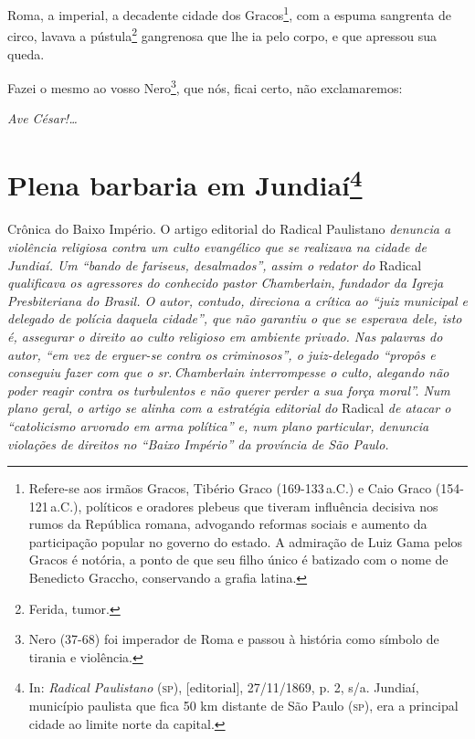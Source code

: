 \noindent\dotfill

Roma, a imperial, a decadente cidade dos Gracos\footnote{Refere-se aos
  irmãos Gracos, Tibério Graco (169-133\,a.C.) e Caio Graco (154-121\,a.C.), 
  políticos e oradores plebeus que tiveram influência
  decisiva nos rumos da República romana, advogando reformas sociais e
  aumento da participação popular no governo do estado. A admiração de
  Luiz Gama pelos Gracos é notória, a ponto de que seu filho único é
  batizado com o nome de Benedicto Graccho, conservando a grafia latina.\label{graco}},
com a espuma sangrenta de circo, lavava a pústula\footnote{Ferida,
  tumor.} gangrenosa que lhe ia pelo corpo, e que apressou sua queda.

Fazei o mesmo ao vosso Nero\footnote{Nero (37-68) foi imperador de
  Roma e passou à história como símbolo de tirania e violência.}, que
nós, ficai certo, não exclamaremos:

\emph{Ave César!\ldots{}}

\chapter{Plena barbaria em Jundiaí\footnote{In: \emph{Radical Paulistano}
  (\textsc{sp}), {[}editorial{]}, 27/11/1869, p. 2, s/a. Jundiaí, município
  paulista que fica 50 km distante de São Paulo (\textsc{sp}), era a principal
  cidade ao limite norte da capital.}}

\begin{didascalia}
Crônica do Baixo Império. O artigo editorial do Radical Paulistano
\emph{denuncia a violência religiosa contra um culto evangélico que se
realizava na cidade de Jundiaí. Um ``bando de fariseus, desalmados'',
assim o redator do} Radical \emph{qualificava os agressores do conhecido
pastor Chamberlain, fundador da Igreja Presbiteriana do Brasil. O autor,
contudo, direciona a crítica ao ``juiz municipal e delegado de polícia
daquela cidade'', que não garantiu o que se esperava dele, isto é,
assegurar o direito ao culto religioso em ambiente privado. Nas palavras
do autor, ``em vez de erguer-se contra os criminosos'', o juiz-delegado
``propôs e conseguiu fazer com que o sr.\,Chamberlain interrompesse o
culto, alegando não poder reagir contra os turbulentos e não querer
perder a sua força moral''. Num plano geral, o artigo se alinha com a
estratégia editorial do} Radical \emph{de atacar o ``catolicismo arvorado
em arma política'' e, num plano particular, denuncia violações de
direitos no ``Baixo Império'' da província de São Paulo.}
\end{didascalia}



